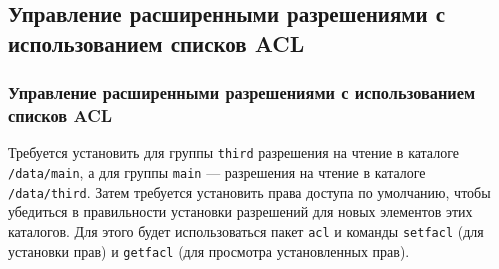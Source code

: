 \documentclass{beamer}
\begin{document}
\subsection{Управление расширенными разрешениями с использованием списков ACL}
\begin{frame}[plain]
	\frametitle{Управление расширенными разрешениями с использованием списков ACL}
	Требуется установить для группы \texttt{third} разрешения на чтение в каталоге \texttt{/data/main}, а для группы \texttt{main} — разрешения на чтение в каталоге \texttt{/data/third}. Затем требуется установить права доступа по умолчанию, чтобы убедиться в правильности установки разрешений для новых элементов этих каталогов. Для этого будет использоваться пакет \texttt{acl} и команды \texttt{setfacl} (для установки прав) и \texttt{getfacl} (для просмотра установленных прав).
\end{frame}
\end{document}
